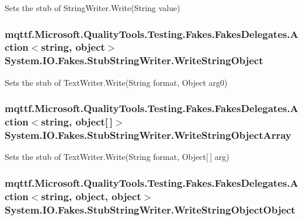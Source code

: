 Sets the stub of String\-Writer.\-Write(\-String value)

\hypertarget{class_system_1_1_i_o_1_1_fakes_1_1_stub_string_writer_af7632de0423468eb1e694fe6a68fd208}{
\subsubsection[{Write\-String\-Object}]{\setlength{\rightskip}{0pt plus 5cm}mqttf.\-Microsoft.\-Quality\-Tools.\-Testing.\-Fakes.\-Fakes\-Delegates.\-Action$<$string, object$>$ System.\-I\-O.\-Fakes.\-Stub\-String\-Writer.\-Write\-String\-Object}}\label{class_system_1_1_i_o_1_1_fakes_1_1_stub_string_writer_af7632de0423468eb1e694fe6a68fd208}


Sets the stub of Text\-Writer.\-Write(\-String format, Object arg0)

\hypertarget{class_system_1_1_i_o_1_1_fakes_1_1_stub_string_writer_a26c9802cc912602702fa5b613ee8a327}{
\subsubsection[{Write\-String\-Object\-Array}]{\setlength{\rightskip}{0pt plus 5cm}mqttf.\-Microsoft.\-Quality\-Tools.\-Testing.\-Fakes.\-Fakes\-Delegates.\-Action$<$string, object\mbox{[}$\,$\mbox{]}$>$ System.\-I\-O.\-Fakes.\-Stub\-String\-Writer.\-Write\-String\-Object\-Array}}\label{class_system_1_1_i_o_1_1_fakes_1_1_stub_string_writer_a26c9802cc912602702fa5b613ee8a327}


Sets the stub of Text\-Writer.\-Write(\-String format, Object\mbox{[}$\,$\mbox{]} arg)

\hypertarget{class_system_1_1_i_o_1_1_fakes_1_1_stub_string_writer_a1f4efb1d0a9b57d1f812b3aa52e97f54}{
\subsubsection[{Write\-String\-Object\-Object}]{\setlength{\rightskip}{0pt plus 5cm}mqttf.\-Microsoft.\-Quality\-Tools.\-Testing.\-Fakes.\-Fakes\-Delegates.\-Action$<$string, object, object$>$ System.\-I\-O.\-Fakes.\-Stub\-String\-Writer.\-Write\-String\-Object\-Object}}\label{class_system_1_1_i_o_1_1_fakes_1_1_stub_string_writer_a1f4efb1d0a9b57d1f812b3aa52e97f54}


